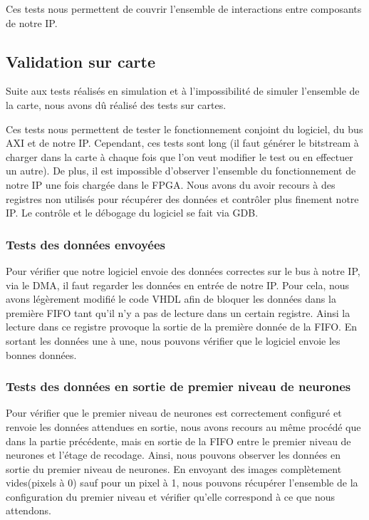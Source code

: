 Ces tests nous permettent de couvrir l'ensemble de interactions entre composants
de notre IP.

\subsection{Validation sur carte}

Suite aux tests réalisés en simulation et à l'impossibilité de simuler
l'ensemble de la carte, nous avons dû réalisé des tests sur cartes.

Ces tests nous permettent de tester le fonctionnement conjoint du logiciel, du
bus AXI et de notre IP. Cependant, ces tests sont long (il faut générer le
bitstream à charger dans la carte à chaque fois que l'on veut modifier le test ou
en effectuer un autre). De plus, il est impossible d'observer l'ensemble du
fonctionnement de notre IP une fois chargée dans le FPGA. Nous avons du avoir
recours à des registres non utilisés pour récupérer des données et contrôler
plus finement notre IP. Le contrôle et le débogage du logiciel se fait via GDB.

\subsubsection{Tests des données envoyées}

Pour vérifier que notre logiciel envoie des données correctes sur le bus à notre
IP, via le DMA, il faut regarder les données en entrée de notre IP.
Pour cela, nous avons légèrement modifié le code VHDL afin de bloquer les
données dans la première FIFO tant qu'il n'y a pas de lecture dans
un certain registre. Ainsi la lecture dans ce registre provoque la sortie de
la première donnée de la FIFO. En sortant les données une à une, nous pouvons
vérifier que le logiciel envoie les bonnes données.

\subsubsection{Tests des données en sortie de premier niveau de neurones}

Pour vérifier que le premier niveau de neurones est correctement configuré et
renvoie les données attendues en sortie, nous avons recours au même procédé que
dans la partie précédente, mais en sortie de la FIFO entre le premier niveau
de neurones et l'étage de recodage.
Ainsi, nous pouvons observer les données en sortie du premier niveau de neurones.
En envoyant des images complètement vides(pixels à 0) sauf pour un pixel à 1,
nous pouvons récupérer l'ensemble de la configuration du premier niveau et
vérifier qu'elle correspond à ce que nous attendons.

